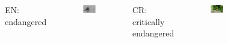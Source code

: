 \begin{frame}
\begin{columns}
\begin{figure}
                \end{figure}
                EN: endangered
                \begin{figure}
                        \includegraphics[height=0.2\textheight]{Pics/EN}
                \end{figure}
                CR: critically endangered
                \begin{figure}
                        \includegraphics[height=0.2\textheight]{Pics/CR}
                \end{figure}
        \end{columns}

\end{frame}

